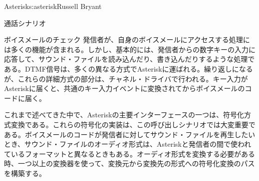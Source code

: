 \begin{aosachapter}{Asterisk}{s:asterisk}{Russell Bryant}
\begin{aosasect1}{通話シナリオ}
\begin{aosasect2}{ボイスメールのチェック}
発信者が、自身のボイスメールにアクセスする処理には多くの機能が含まれる。しかし、基本的には、発信者からの数字キーの入力に応答して、サウンド・ファイルを読み込んだり、書き込んだりするような処理である。DTMF信号は、多くの異なる方式でAsteriskに運ばれる。繰り返しになるが、これらの詳細方式の部分は、チャネル・ドライバで行われる。キー入力がAsteriskに届くと、共通のキー入力イベントに変換されてからボイスメールのコードに届く。

これまで述べてきた中で、Asteriskの主要インターフェースの一つは、符号化方式変換である。これらの符号化の実装は、この呼び出しシナリオでは大変重要である。ボイスメールのコードが発信者に対してサウンド・ファイルを再生したいとき、サウンド・ファイルのオーディオ形式は、Asteriskと発信者の間で使われているフォーマットと異なるときもある。オーディオ形式を変換する必要がある時、一つ以上の変換器を使って、変換元から変換先の形式への符号化変換のパスを構築する。



\end{aosasect2}
\end{aosasect1}
\end{aosachapter}
